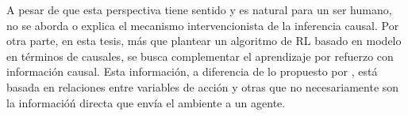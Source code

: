 A pesar de que esta perspectiva tiene sentido y es natural para un ser humano, no se aborda o explica el mecanismo intervencionista de la inferencia causal. 
Por otra parte, en esta tesis, más que plantear un algoritmo de RL 
basado en modelo en términos de causales, se
busca complementar el aprendizaje por refuerzo con información causal.
Esta información, a diferencia de lo propuesto por \cite{Gershman2017}, está
basada en relaciones entre variables de acción y otras que no necesariamente son la informacióń directa que envía el ambiente a un agente.



